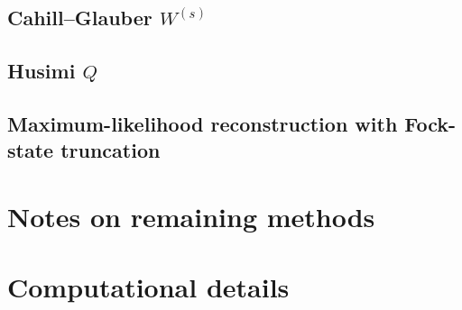 \documentclass[%
  aps, amsmath, amssymb, onecolumn, 11pt
]{revtex4-2}
\begin{document}

\subsection{Cahill--Glauber $W^{(s)}$}
\label{sec:cahillglauber}


\subsection{Husimi $Q$}
\label{sec:husimi}


\subsection{Maximum-likelihood reconstruction with Fock-state truncation}
\label{sec:maxlik}



\section{Notes on remaining methods}
\label{sec:remaining}



\section{Computational details}
\label{sec:computational}



\end{document}
